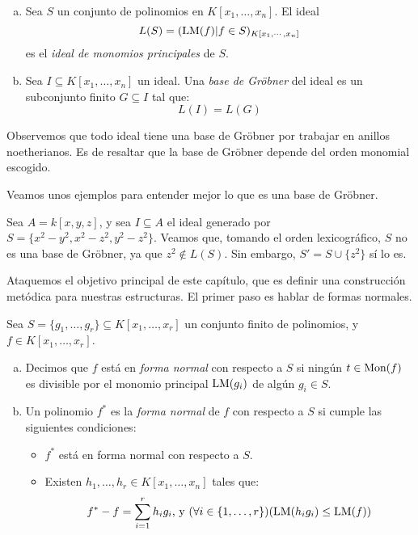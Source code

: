 \begin{definition}
\begin{enumerate}[(a)]
\item Sea $S$ un conjunto de polinomios en $K[x_1, \dots, x_n]$. El ideal
$$ L(S) = (\textrm{LM}(f) | f \in S)_{K[x_1,\cdots, x_n]} $$
es el \emph{ideal de monomios principales} de $S$.
\item Sea $I \subseteq K[x_1,\dots,x_n]$ un ideal. Una \emph{base de Gröbner} del ideal es un subconjunto finito $G \subseteq I$ tal que:
$$L(I) = L(G)$$
\end{enumerate}
\end{definition}

Observemos que todo ideal tiene una base de Gröbner por trabajar en anillos noetherianos. Es de resaltar que la base de Gröbner depende del orden monomial escogido.

Veamos unos ejemplos para entender mejor lo que es una base de Gröbner.

\begin{example}
Sea $A = k[x,y,z]$, y sea $I\subseteq A$ el ideal generado por $S = \{x^2 - y^2, x^2 - z^2, y^2 - z^2\}$. Veamos que, tomando el orden lexicográfico, $S$ no es una base de Gröbner, ya que $z^2 \not\in L(S)$. Sin embargo, $S' = S \cup \{z^2\}$ sí lo es.
\end{example}

Ataquemos el objetivo principal de este capítulo, que es definir una construcción metódica para nuestras estructuras. El primer paso es hablar de formas normales.
\begin{definition} \label{normal form}
Sea $S = \{g_1, \dots, g_r\} \subseteq K[x_1,\dots, x_r]$ un conjunto finito de polinomios, y $f \in K[x_1,\dots, x_r]$.
\begin{enumerate}[(a)]
\item Decimos que $f$ está en \emph{forma normal} con respecto a $S$ si ningún $t \in \textrm{Mon}(f)$ es divisible por el monomio principal $\textrm{LM}(g_i)$ de algún $g_i \in S$.
\item Un polinomio $f^*$ es la \emph{forma normal} de $f$ con respecto a $S$ si cumple las siguientes condiciones:
\begin{itemize}
\item $f^*$ está en forma normal con respecto a $S$.
\item Existen $h_1,\dots, h_r \in K[x_1,\dots,x_n]$ tales que:
$$f^* - f = \sum_{i=1}^r h_ig_i\textrm{, y }(\forall i \in \{1,\dots,r\})(\textrm{LM}(h_ig_i) \leq \textrm{LM}(f))$$
\end{itemize}
\end{enumerate}
\end{definition}

